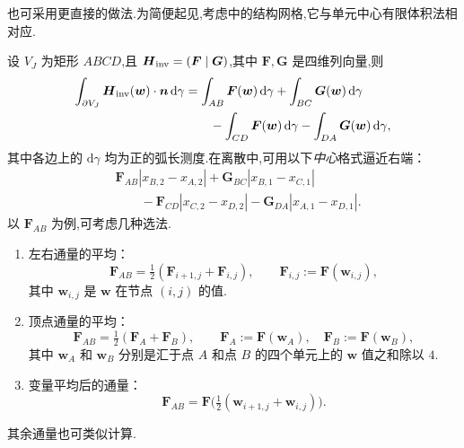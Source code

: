 也可采用更直接的做法.为简便起见,考虑中的结构网格,它与单元中心有限体积法相对应.

设 \(V_J\) 为矩形 \(ABCD\),且 \(\boldsymbol{H}_{\rm inv}=(\boldsymbol{F}\mid\boldsymbol{G})\),其中 \(\boldsymbol{F},\boldsymbol{G}\) 是四维列向量,则
\begin{equation}\label{eq:14.6.10}
  \begin{aligned}
    \int_{\partial V_J}\boldsymbol{H}_{\rm inv}(\boldsymbol{w})\cdot\boldsymbol{n}\,\mathrm d\gamma
      &=\int_{AB}\boldsymbol{F}(\boldsymbol{w})\,\mathrm d\gamma
          +\int_{BC}\boldsymbol{G}(\boldsymbol{w})\,\mathrm d\gamma\\
      &\qquad-\int_{CD}\boldsymbol{F}(\boldsymbol{w})\,\mathrm d\gamma
          -\int_{DA}\boldsymbol{G}(\boldsymbol{w})\,\mathrm d\gamma,
  \end{aligned}
\end{equation}
其中各边上的 \(\mathrm d\gamma\) 均为正的弧长测度.在离散中,可用以下\emph{中心}格式逼近右端：
\begin{equation}\label{eq:14.6.11}
  \begin{aligned}
    &\boldsymbol{F}_{AB}|x_{B,2}-x_{A,2}|+\boldsymbol{G}_{BC}|x_{B,1}-x_{C,1}|\\
    &\qquad-\boldsymbol{F}_{CD}|x_{C,2}-x_{D,2}|
             -\boldsymbol{G}_{DA}|x_{A,1}-x_{D,1}|.
  \end{aligned}
\end{equation}
以 \(\boldsymbol{F}_{AB}\) 为例,可考虑几种选法.
\begin{enumerate}[label=\alph*.]
  \item 左右通量的平均：
    \begin{equation}\label{eq:14.6.12}
      \boldsymbol{F}_{AB}=\tfrac12(\boldsymbol{F}_{i+1,j}+\boldsymbol{F}_{i,j}),
      \qquad\boldsymbol{F}_{i,j}:=\boldsymbol{F}(\boldsymbol{w}_{i,j}),
    \end{equation}
    其中 \(\boldsymbol{w}_{i,j}\) 是 \(\boldsymbol{w}\) 在节点 \((i,j)\) 的值.
  \item 顶点通量的平均：
    \begin{equation}\label{eq:14.6.13}
      \boldsymbol{F}_{AB}=\tfrac12(\boldsymbol{F}_A+\boldsymbol{F}_B),
      \qquad\boldsymbol{F}_A:=\boldsymbol{F}(\boldsymbol{w}_A),\quad
            \boldsymbol{F}_B:=\boldsymbol{F}(\boldsymbol{w}_B),
    \end{equation}
    其中 \(\boldsymbol{w}_A\) 和 \(\boldsymbol{w}_B\) 分别是汇于点 \(A\) 和点 \(B\) 的四个单元上的 \(\boldsymbol{w}\) 值之和除以 \(4\).
  \item 变量平均后的通量：
    \begin{equation}\label{eq:14.6.14}
      \boldsymbol{F}_{AB}=\boldsymbol{F}\bigl(\tfrac12(\boldsymbol{w}_{i+1,j}+\boldsymbol{w}_{i,j})\bigr).
    \end{equation}
\end{enumerate}
其余通量也可类似计算.

